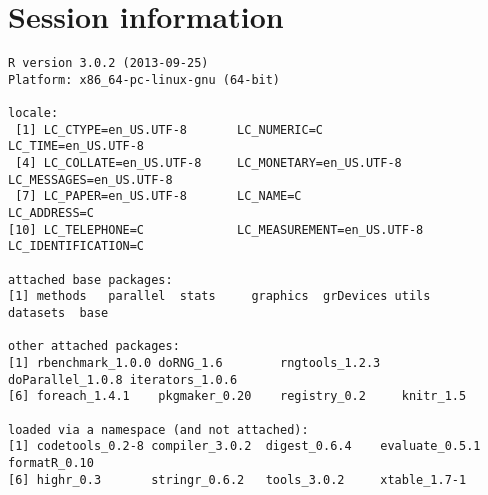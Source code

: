 \documentclass[a4paper,12pt]{article}\usepackage[]{graphicx}\usepackage[]{color}
\makeatletter
\newenvironment{kframe}{%
 \def\at@end@of@kframe{}%
 \ifinner\ifhmode%
  \def\at@end@of@kframe{\end{minipage}}%
  \begin{minipage}{\columnwidth}%
 \fi\fi%
 \def\FrameCommand##1{\hskip\@totalleftmargin \hskip-\fboxsep
 \colorbox{shadecolor}{##1}\hskip-\fboxsep
     \hskip-\linewidth \hskip-\@totalleftmargin \hskip\columnwidth}%
 \MakeFramed {\advance\hsize-\width
   \@totalleftmargin\z@ \linewidth\hsize
   \@setminipage}}%
 {\par\unskip\endMakeFramed%
 \at@end@of@kframe}
\newenvironment{knitrout}{}{} %
\makeatother
\begin{document}
\section*{Session information}
\begin{knitrout}\footnotesize
{}\color{fgcolor}\begin{kframe}
\begin{verbatim}
R version 3.0.2 (2013-09-25)
Platform: x86_64-pc-linux-gnu (64-bit)

locale:
 [1] LC_CTYPE=en_US.UTF-8       LC_NUMERIC=C               LC_TIME=en_US.UTF-8       
 [4] LC_COLLATE=en_US.UTF-8     LC_MONETARY=en_US.UTF-8    LC_MESSAGES=en_US.UTF-8   
 [7] LC_PAPER=en_US.UTF-8       LC_NAME=C                  LC_ADDRESS=C              
[10] LC_TELEPHONE=C             LC_MEASUREMENT=en_US.UTF-8 LC_IDENTIFICATION=C       

attached base packages:
[1] methods   parallel  stats     graphics  grDevices utils     datasets  base     

other attached packages:
[1] rbenchmark_1.0.0 doRNG_1.6        rngtools_1.2.3   doParallel_1.0.8 iterators_1.0.6 
[6] foreach_1.4.1    pkgmaker_0.20    registry_0.2     knitr_1.5       

loaded via a namespace (and not attached):
[1] codetools_0.2-8 compiler_3.0.2  digest_0.6.4    evaluate_0.5.1  formatR_0.10   
[6] highr_0.3       stringr_0.6.2   tools_3.0.2     xtable_1.7-1   
\end{verbatim}
\end{kframe}
\end{knitrout}


\printbibliography[heading=bibintoc]
\end{document}
